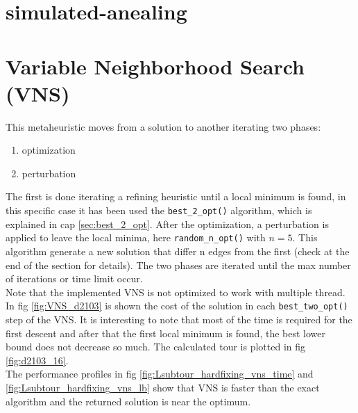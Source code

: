 \section{simulated-anealing}

\section{Variable Neighborhood Search (VNS)}
This metaheuristic moves from a solution to another iterating two phases:
\begin{enumerate}
	\item optimization
	\item perturbation
\end{enumerate}
The first is done iterating a refining heuristic until a local minimum is found, in this specific case it has been used the \texttt{best\_2\_opt()} algorithm, which is explained in cap \ref{sec:best_2_opt}. After the optimization, a perturbation is applied to leave the local minima, here \texttt{random\_n\_opt()} with $ n=5 $. This algorithm generate a new solution that differ n edges from the first (check at the end of the section for details).
The two phases are iterated until the max number of iterations or time limit occur.\\
Note that the implemented VNS is not optimized to work with multiple thread.\\
In fig \ref{fig:VNS_d2103} is shown the cost of the solution in each \texttt{best\_two\_opt()} step of the VNS. It is interesting to note that most of the time is required for the first descent and after that the first local minimum is found, the best lower bound does not decrease so much.
The calculated tour is plotted in fig \ref{fig:d2103_16}.\\
The performance profiles in fig \ref{fig:Lsubtour_hardfixing_vns_time} and \ref{fig:Lsubtour_hardfixing_vns_lb} show that VNS is faster than the exact algorithm and the returned solution is near the optimum.

